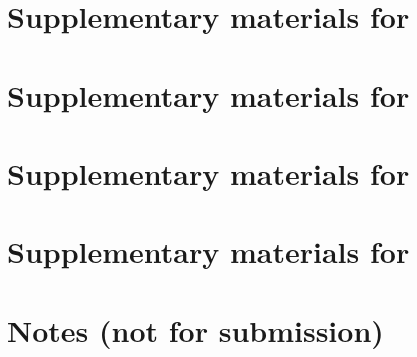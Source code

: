 \documentclass[conference]{IEEEtran}
\begin{document}
\appendices




\section{Supplementary materials for }



\section{Supplementary materials for }



\section{Supplementary materials for }



\section{Supplementary materials for }



\section{Notes (not for submission)}




\tableofcontents
\end{document}

